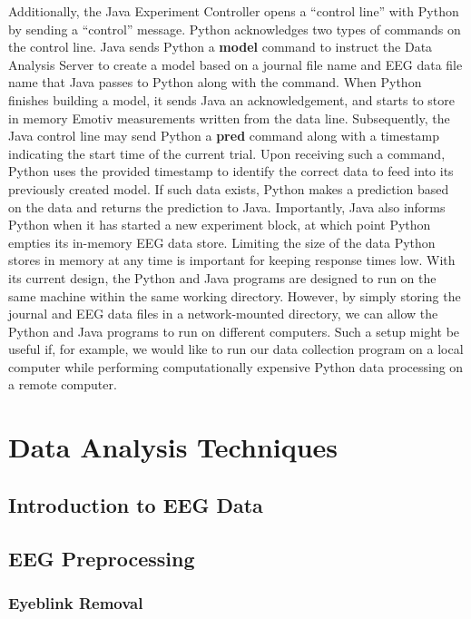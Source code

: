 \documentclass[11pt]{report}
\begin{document}
	Additionally, the Java Experiment Controller opens a ``control line'' with Python by sending a ``control'' message.  Python acknowledges two types of commands on the control line.  Java sends Python a {\bf model} command to instruct the Data Analysis Server to create a model based on a journal file name and EEG data file name that Java passes to Python along with the command.  When Python finishes building a model, it sends Java an acknowledgement, and starts to store in memory Emotiv measurements written from the data line.  Subsequently, the Java control line may send Python a {\bf pred} command along with a timestamp indicating the start time of the current trial.  Upon receiving such a command, Python uses the provided timestamp to identify the correct data to feed into its previously created model.  If such data exists, Python makes a prediction based on the data and returns the prediction to Java.  Importantly, Java also informs Python when it has started a new experiment block, at which point Python empties its in-memory EEG data store.  Limiting the size of the data Python stores in memory at any time is important for keeping response times low.  
	With its current design, the Python and Java programs are designed to run on the same machine within the same working directory.  However, by simply storing the journal and EEG data files in a network-mounted directory, we can allow the Python and Java programs to run on different computers.  Such a setup might be useful if, for example, we would like to run our data collection program on a local computer while performing computationally expensive Python data processing on a remote computer.


\section{Data Analysis Techniques}

\subsection{Introduction to EEG Data}
\subsection{EEG Preprocessing}
\subsubsection{Eyeblink Removal}
\end{document}
